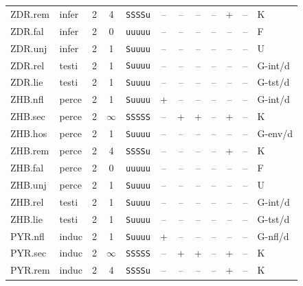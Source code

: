 {\begin{longtable}{@{}llcccccccccl@{}}
ZDR.rem & infer & 2 & 4 & \texttt{SSSSu} & \textsf{--} & \textsf{--} & \textsf{--} & \textsf{--} & \textsf{+} & -- & K \\
ZDR.fal & infer & 2 & 0 & \texttt{uuuuu} & \textsf{--} & \textsf{--} & \textsf{--} & \textsf{--} & \textsf{--} & -- & F \\
ZDR.unj & infer & 2 & 1 & \texttt{Suuuu} & \textsf{--} & \textsf{--} & \textsf{--} & \textsf{--} & \textsf{--} & -- & U \\
ZDR.rel & testi & 2 & 1 & \texttt{Suuuu} & \textsf{--} & \textsf{--} & \textsf{--} & \textsf{--} & \textsf{--} & -- & G-int/d \\
ZDR.lie & testi & 2 & 1 & \texttt{Suuuu} & \textsf{--} & \textsf{--} & \textsf{--} & \textsf{--} & \textsf{--} & -- & G-tst/d \\
ZHB.nfl & perce & 2 & 1 & \texttt{Suuuu} & \textsf{+} & \textsf{--} & \textsf{--} & \textsf{--} & \textsf{--} & -- & G-int/d \\
ZHB.sec & perce & 2 & $\infty$ & \texttt{SSSSS} & \textsf{--} & \textsf{+} & \textsf{+} & \textsf{--} & \textsf{+} & -- & K \\
ZHB.hos & perce & 2 & 1 & \texttt{Suuuu} & \textsf{--} & \textsf{--} & \textsf{--} & \textsf{--} & \textsf{--} & -- & G-env/d \\
ZHB.rem & perce & 2 & 4 & \texttt{SSSSu} & \textsf{--} & \textsf{--} & \textsf{--} & \textsf{--} & \textsf{+} & -- & K \\
ZHB.fal & perce & 2 & 0 & \texttt{uuuuu} & \textsf{--} & \textsf{--} & \textsf{--} & \textsf{--} & \textsf{--} & -- & F \\
ZHB.unj & perce & 2 & 1 & \texttt{Suuuu} & \textsf{--} & \textsf{--} & \textsf{--} & \textsf{--} & \textsf{--} & -- & U \\
ZHB.rel & testi & 2 & 1 & \texttt{Suuuu} & \textsf{--} & \textsf{--} & \textsf{--} & \textsf{--} & \textsf{--} & -- & G-int/d \\
ZHB.lie & testi & 2 & 1 & \texttt{Suuuu} & \textsf{--} & \textsf{--} & \textsf{--} & \textsf{--} & \textsf{--} & -- & G-tst/d \\
PYR.nfl & induc & 2 & 1 & \texttt{Suuuu} & \textsf{+} & \textsf{--} & \textsf{--} & \textsf{--} & \textsf{--} & -- & G-nfl/d \\
PYR.sec & induc & 2 & $\infty$ & \texttt{SSSSS} & \textsf{--} & \textsf{+} & \textsf{+} & \textsf{--} & \textsf{+} & -- & K \\
PYR.rem & induc & 2 & 4 & \texttt{SSSSu} & \textsf{--} & \textsf{--} & \textsf{--} & \textsf{--} & \textsf{+} & -- & K \\

\end{longtable}}
